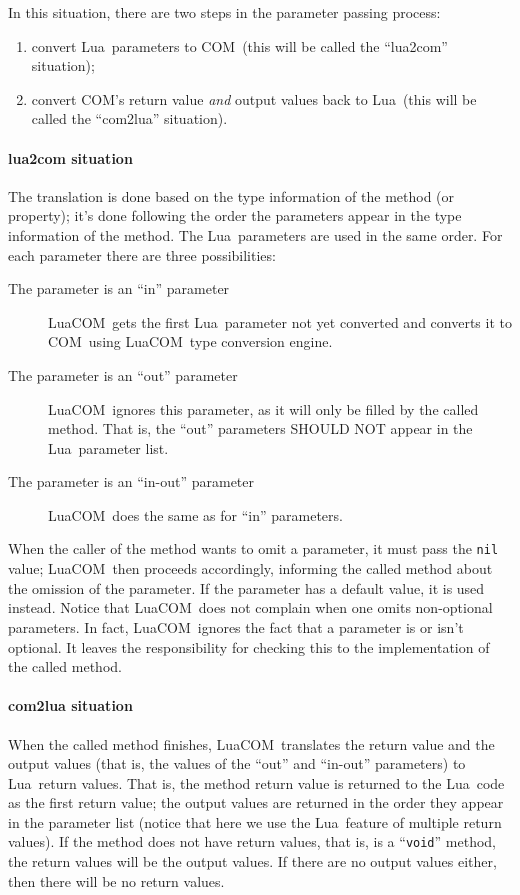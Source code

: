 \documentclass[11pt,a4paper,english]{report}
\newcommand{\ident}[1]{\mbox{\texttt{#1}}}
\newcommand{\techname}[1]{\mbox{#1}}
\newcommand{\lua}{\techname{Lua}}
\newcommand{\com}{\techname{COM}}
\newcommand{\luacom}{\techname{LuaCOM}}
\begin{document}
  In this situation, there are two steps in the parameter passing
  process:

\begin{enumerate}
\item convert \lua\ parameters to \com\ (this will be called the
``lua2com'' situation);
\item convert \com's return value \emph{and} output values back to
\lua\ (this will be called the ``com2lua'' situation).
\end{enumerate}

\paragraph{lua2com situation} The translation is done based on the
type information of the method (or property); it's done following the
order the parameters appear in the type information of the method. The
\lua\ parameters are used in the same order. For each parameter there
are three possibilities:

\begin{description}
\item [The parameter is an ``in'' parameter] \luacom\ gets the first
\lua\ parameter not yet converted and converts it to \com\ using
\luacom\ type conversion engine.

\item [The parameter is an ``out'' parameter] \luacom\ ignores this
parameter, as it will only be filled by the called method. That is,
the ``out'' parameters SHOULD NOT appear in the \lua\ parameter list.

\item [The parameter is an ``in-out'' parameter] \luacom\ does the
same as for ``in'' parameters.

\end{description}

When the caller of the method wants to omit a parameter, it must pass
the \ident{nil} value; \luacom\ then proceeds accordingly, informing
the called method about the omission of the parameter. If the
parameter has a default value, it is used instead. Notice that
\luacom\ does not complain when one omits non-optional parameters. In
fact, \luacom\ ignores the fact that a parameter is or isn't
optional. It leaves the responsibility for checking this to the
implementation of the called method.

\paragraph{com2lua situation} When the called method finishes,
\luacom\ translates the return value and the output values (that is,
the values of the ``out'' and ``in-out'' parameters) to \lua\ return
values. That is, the method return value is returned to the \lua\ code
as the first return value; the output values are returned in the order
they appear in the parameter list (notice that here we use the \lua\
feature of multiple return values). If the method does not have return
values, that is, is a ``\ident{void}'' method, the return values will
be the output values. If there are no output values either, then there
will be no return values.
\end{document}
